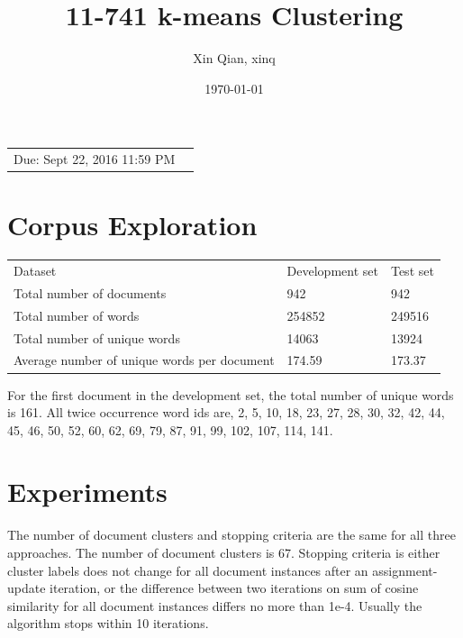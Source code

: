 \documentclass{article}
\title{11-741 k-means Clustering} %
\author{Xin Qian, xinq} %
\date{\today} %
\begin{document}
\maketitle %

\begin{center}
\begin{tabular}{l r}
Due: Sept 22, 2016 11:59 PM\end{tabular}
\end{center}



\section{Corpus Exploration}
\begin{center}
\begin{tabular}{lll}
Dataset & Development set & Test set \\
Total number of documents & 942 & 942 \\
Total number of words & 254852 &249516\\
Total number of unique words& 14063&13924\\
Average number of unique words per document & 174.59&173.37
\end{tabular}
\end{center}

For the first document in the development set, the total number of unique words is 161. All twice occurrence word ids are,
2, 5, 10, 18, 23, 27, 28, 30, 32, 42, 44, 45, 46, 50, 52, 60, 62, 69, 79, 87, 91, 99, 102, 107, 114, 141.\\

\section{Experiments}
The number of document clusters and stopping criteria are the same for all three approaches. The number of document clusters is 67. Stopping criteria is either cluster labels does not change for all document instances after an assignment-update iteration, or the difference between two iterations on sum of cosine similarity for all document instances differs no more than 1e-4. Usually the algorithm stops within 10 iterations.
\end{document}
